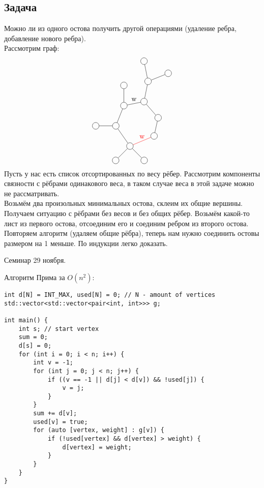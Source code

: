 \documentclass[12pt, a4paper]{article}
\begin{document}
    \subsection*{Задача}
    Можно ли из одного остова получить другой операциями (удаление ребра, добавление нового ребра).\\
    Рассмотрим граф: 
    \[\begin{tikzpicture}[every circle node/.style={circle, draw}]
        \draw (0, 0) node[circle](0){};
        \draw (0.2, -1) node[circle](1){};
        \draw (1.2, -0.6) node[circle](2){};
        \draw (0) -- (1);
        \draw (1) -- (2);
        \draw (0, -2) node[circle](3){};
        \draw (1) -- (3);
        \draw (-1, -2.2) node[circle](4){};
        \draw (3) -- node[anchor=south]{w} (4);
        \draw (-1.4, -3.2) node[circle](5){};
        \draw (4) -- (5);
        \draw (-0.7, -4.2) node[circle](6){};
        \draw (5) -- (6);
        \draw (0.5, -3.7) node[circle](7){};
        \draw[red] (6) -- node[anchor=south]{w} (7); 
        \draw (0.7, -2.8) node[circle](8){};
        \draw (7) -- (8);
        \draw (3) -- (8);
        \draw node[above of=4][circle](9){};
        \draw (4) -- (9);
        \draw node[left of=5][circle](10){};
        \draw (5) -- (10);
        \draw node[below left of=6][circle](11){};
        \draw (6) -- (11);
        \draw node[below right of=6][circle](12){};
        \draw (6) -- (12);
    \end{tikzpicture}\]
    Пусть у нас есть список отсортированных по весу рёбер. Рассмотрим компоненты связности с рёбрами одинакового веса, в таком случае веса в этой задаче можно не рассматривать.\\
    Возьмём два произольных минимальных остова, склеим их общие вершины.\\
    Получаем ситуацию с рёбрами без весов и без общих рёбер. Возьмём какой-то лист из первого остова, отсоединим его и соединим ребром из второго остова. Повторяем алгоритм (удаляем общие рёбра), теперь нам нужно соединить остовы размером на 1 меньше. По индукции легко доказать.
    \newpage
    \begin{center}
        Семинар 29 ноября.
    \end{center}
    Алгоритм Прима за $O(n^2)$:
    \begin{lstlisting}
int d[N] = INT_MAX, used[N] = 0; // N - amount of vertices
std::vector<std::vector<pair<int, int>>> g;

int main() {
    int s; // start vertex
    sum = 0;
    d[s] = 0;
    for (int i = 0; i < n; i++) {
        int v = -1;
        for (int j = 0; j < n; j++) {
            if ((v == -1 || d[j] < d[v]) && !used[j]) {
                v = j;
            }
        }
        sum += d[v];
        used[v] = true;
        for (auto [vertex, weight] : g[v]) {
            if (!used[vertex] && d[vertex] > weight) {
                d[vertex] = weight;
            }
        }
    }
}
    \end{lstlisting}
\end{document}
